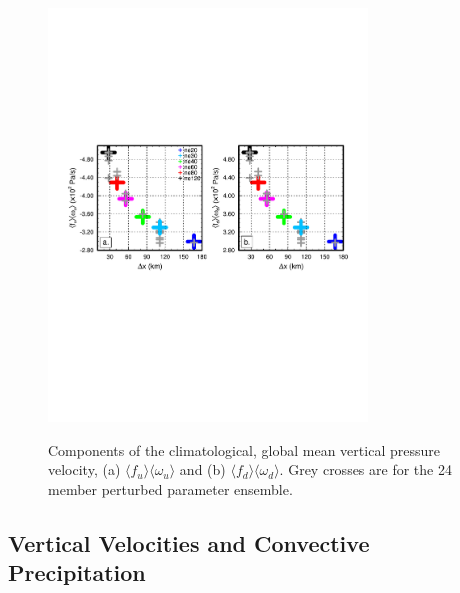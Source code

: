 \documentclass[times]{qjrms4}
\begin{document}
\begin{figure}
\begin{center}
\noindent\includegraphics[width=20pc,angle=0]{figs/temp_diags_2panel.pdf}\\
\end{center}
\caption{Components of the climatological, global mean vertical pressure velocity, (a) $\langle f_{u} \rangle \langle \omega_{u} \rangle$ and (b) $\langle f_{d} \rangle \langle \omega_{d} \rangle$. Grey crosses are for the 24 member perturbed parameter ensemble.}
\label{fig:2panel}
\end{figure}

\subsection{Vertical Velocities and Convective Precipitation}
\end{document}
